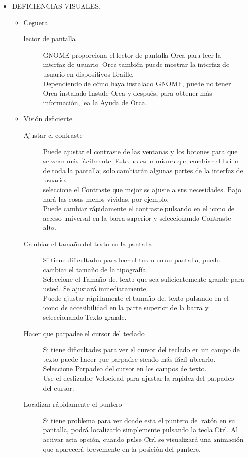 \documentclass[12pt,letterpaper]{book}
\begin{document}
\begin{itemize}
\item DEFICIENCIAS VISUALES.
\begin{itemize}
\item Ceguera
\begin{description}
\item[lector de pantalla] GNOME proporciona el lector de pantalla Orca para leer la interfaz de usuario. Orca también puede mostrar la interfaz de usuario en dispositivos Braille.\\
Dependiendo de cómo haya instalado GNOME, puede no tener Orca instalado Instale Orca y después, para obtener más información, lea la Ayuda de Orca.
\end{description}
\item Visión deficiente
   \begin{description}
  	\item[Ajustar el contraste] Puede ajustar el contraste de las ventanas y los botones 		para que se vean más fácilmente. Esto no es lo mismo que cambiar el brillo de 				toda la pantalla; solo cambiarán algunas partes de la interfaz de usuario.\\
seleccione el Contraste que mejor se ajuste a sus necesidades. Bajo hará las cosas menos vívidas, por ejemplo.\\
Puede cambiar rápidamente el contraste pulsando en el icono de acceso universal en la barra superior y seleccionando Contraste alto.
  	\item[Cambiar el tamaño del texto en la pantalla] Si tiene dificultades para leer el texto en su pantalla, puede cambiar el tamaño de la tipografía.\\
Seleccione el Tamaño del texto que sea suficientemente grande para usted. Se ajustará inmediatamente.\\
Puede ajustar rápidamente el tamaño del texto pulsando en el icono de accesibilidad en la parte superior de la barra y seleccionando Texto grande.
	\item[Hacer que parpadee el cursor del teclado ] Si tiene dificultades para ver el cursor del teclado en un campo de texto puede hacer que parpadee siendo más fácil ubicarlo.\\
Seleccione Parpadeo del cursor en los campos de texto.\\
Use el deslizador Velocidad para ajustar la rapidez del parpadeo del cursor.
	\item[Localizar rápidamente el puntero] Si tiene problema para ver donde esta el puntero del ratón en su pantalla, podrá localizarlo simplemente pulsando la tecla Ctrl. Al activar esta opción, cuando pulse Ctrl se visualizará una animación que aparecerá brevemente en la posición del puntero.\\

\end{description}
\end{itemize}
\end{itemize}
\end{document}
